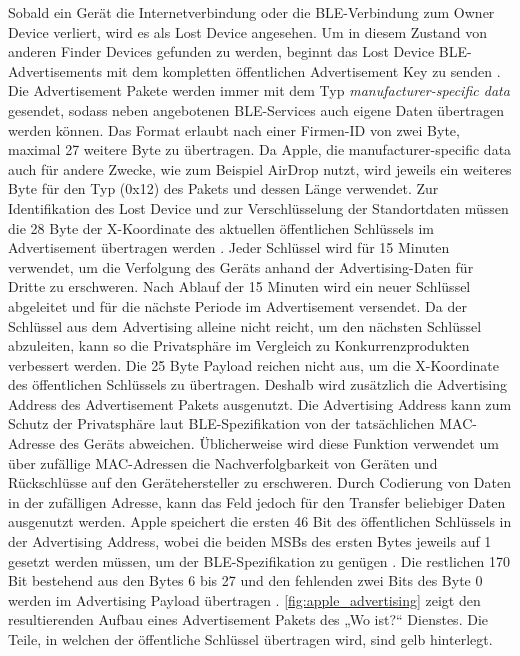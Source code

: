 Sobald ein Gerät die Internetverbindung oder die \ac{BLE}-Verbindung zum Owner Device verliert, wird es als Lost Device angesehen.
Um in diesem Zustand von anderen Finder Devices gefunden zu werden, beginnt das Lost Device \ac{BLE}-Advertisements mit dem kompletten öffentlichen Advertisement Key zu senden \cite{Apple_FindMySpec}.
Die Advertisement Pakete werden immer mit dem Typ \textit{manufacturer-specific data} gesendet, sodass neben angebotenen \ac{BLE}-Services auch eigene Daten übertragen werden können.
Das Format erlaubt nach einer Firmen-ID von zwei Byte, maximal 27 weitere Byte zu übertragen.
Da Apple, die manufacturer-specific data auch für andere Zwecke, wie zum Beispiel AirDrop nutzt, wird jeweils ein weiteres Byte für den Typ (0x12) des Pakets und dessen Länge verwendet.
Zur Identifikation des Lost Device und zur Verschlüsselung der Standortdaten müssen die 28 Byte der X-Koordinate des aktuellen öffentlichen Schlüssels im Advertisement übertragen werden \cite{Heinrich_FindMy}.
Jeder Schlüssel wird für 15 Minuten verwendet, um die Verfolgung des Geräts anhand der Advertising-Daten für Dritte zu erschweren.
Nach Ablauf der 15 Minuten wird ein neuer Schlüssel abgeleitet und für die nächste Periode im Advertisement versendet.
Da der Schlüssel aus dem Advertising alleine nicht reicht, um den nächsten Schlüssel abzuleiten, kann so die Privatsphäre im Vergleich zu Konkurrenzprodukten verbessert werden.
Die 25 Byte Payload reichen nicht aus, um die X-Koordinate des öffentlichen Schlüssels zu übertragen.
Deshalb  wird zusätzlich die Advertising Address des Advertisement Pakets ausgenutzt.
Die Advertising Address kann zum Schutz der Privatsphäre laut \ac{BLE}-Spezifikation \cite{Spec_BLE_5.3} von der tatsächlichen \ac{MAC}-Adresse des Geräts abweichen.
Üblicherweise wird diese Funktion verwendet um über zufällige \ac{MAC}-Adressen die Nachverfolgbarkeit von Geräten und Rückschlüsse auf den Gerätehersteller zu erschweren.
Durch Codierung von Daten in der zufälligen Adresse, kann das Feld jedoch für den Transfer beliebiger Daten ausgenutzt werden.
Apple speichert die ersten 46 Bit des öffentlichen Schlüssels in der Advertising Address, wobei die beiden \acp{MSB} des ersten Bytes jeweils auf 1 gesetzt werden müssen, um der \ac{BLE}-Spezifikation zu genügen \cite{Heinrich_FindMy}.
Die restlichen 170 Bit bestehend aus den Bytes 6 bis 27 und den fehlenden zwei Bits des Byte 0 werden im Advertising Payload übertragen \cite{Apple_FindMySpec}.
\autoref{fig:apple_advertising} zeigt den resultierenden Aufbau eines Advertisement Pakets des „Wo ist?“ Dienstes.
Die Teile, in welchen der öffentliche Schlüssel übertragen wird, sind gelb hinterlegt.

